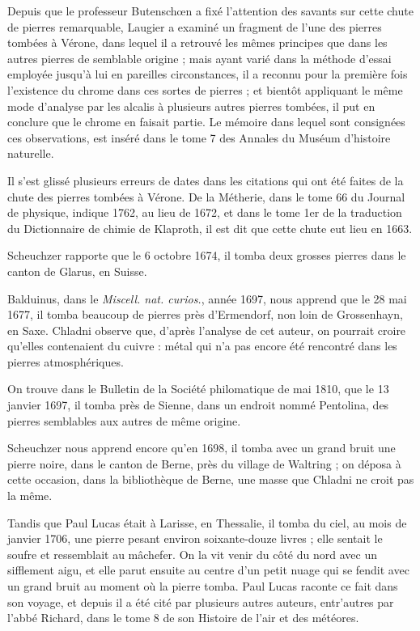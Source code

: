 \documentclass[a4paper, 12pt, oneside, french]{article}
\begin{document}
Depuis que le professeur Butenschœn a fixé l'attention des savants sur cette chute de pierres remarquable, Laugier a examiné un fragment de l'une des pierres tombées à Vérone, dans lequel il a retrouvé les mêmes principes que dans les autres pierres de semblable origine ; mais ayant varié dans la méthode d'essai employée jusqu'à lui en pareilles circonstances, il a reconnu pour la première fois l'existence du chrome dans ces sortes de pierres ; et bientôt appliquant le même mode d'analyse par les alcalis à plusieurs autres pierres tombées, il put en conclure que le chrome en faisait partie. Le mémoire dans lequel sont consignées ces observations, est inséré dans le tome 7 des Annales du Muséum d'histoire naturelle.

Il s'est glissé plusieurs erreurs de dates dans les citations qui ont été faites de la chute des pierres tombées à Vérone. De la Métherie, dans le tome 66 du Journal de physique, indique 1762, au lieu de 1672, et dans le tome 1er de la traduction du Dictionnaire de chimie de Klaproth, il est dit que cette chute eut lieu en 1663.

Scheuchzer rapporte que le 6 octobre 1674, il tomba deux grosses pierres dans le canton de Glarus, en Suisse.

Balduinus, dans le \emph{Miscell. nat. curios.}, année 1697, nous apprend que le 28 mai 1677, il tomba beaucoup de pierres près d'Ermendorf, non loin de Grossenhayn, en Saxe. Chladni observe que, d'après l'analyse de cet auteur, on pourrait croire qu'elles contenaient du cuivre : métal qui n'a pas encore été rencontré dans les pierres atmosphériques.

On trouve dans le Bulletin de la Société philomatique de mai 1810, que le 13 janvier 1697, il tomba près de Sienne, dans un endroit nommé Pentolina, des pierres semblables aux autres de même origine.

Scheuchzer nous apprend encore qu'en 1698, il tomba avec un grand bruit une pierre noire, dans le canton de Berne, près du village de Waltring ; on déposa à cette occasion, dans la bibliothèque de Berne, une masse que Chladni ne croit pas la même.

Tandis que Paul Lucas était à Larisse, en Thessalie, il tomba du ciel, au mois de janvier 1706, une pierre pesant environ soixante-douze livres ; elle sentait le soufre et ressemblait au mâchefer. On la vit venir du côté du nord avec un sifflement aigu, et elle parut ensuite au centre d'un petit nuage qui se fendit avec un grand bruit au moment où la pierre tomba. Paul Lucas raconte ce fait dans son voyage, et depuis il a été cité par plusieurs autres auteurs, entr'autres par l'abbé Richard, dans le tome 8 de son Histoire de l'air et des météores.
\end{document}
